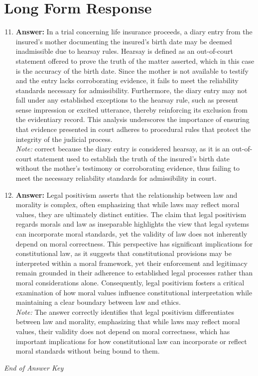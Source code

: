 \documentclass[12pt]{article}
\begin{document}
\section*{Long Form Response}
\begin{enumerate}[label=\arabic*.]
\setcounter{enumi}{10}
\item \textbf{Answer:} In a trial concerning life insurance proceeds, a diary entry from the insured's mother documenting the insured's birth date may be deemed inadmissible due to hearsay rules. Hearsay is defined as an out-of-court statement offered to prove the truth of the matter asserted, which in this case is the accuracy of the birth date. Since the mother is not available to testify and the entry lacks corroborating evidence, it fails to meet the reliability standards necessary for admissibility. Furthermore, the diary entry may not fall under any established exceptions to the hearsay rule, such as present sense impression or excited utterance, thereby reinforcing its exclusion from the evidentiary record. This analysis underscores the importance of ensuring that evidence presented in court adheres to procedural rules that protect the integrity of the judicial process.
\\ \textit{Note:} correct because the diary entry is considered hearsay, as it is an out-of-court statement used to establish the truth of the insured's birth date without the mother's testimony or corroborating evidence, thus failing to meet the necessary reliability standards for admissibility in court.
\item \textbf{Answer:} Legal positivism asserts that the relationship between law and morality is complex, often emphasizing that while laws may reflect moral values, they are ultimately distinct entities. The claim that legal positivism regards morals and law as inseparable highlights the view that legal systems can incorporate moral standards, yet the validity of law does not inherently depend on moral correctness. This perspective has significant implications for constitutional law, as it suggests that constitutional provisions may be interpreted within a moral framework, yet their enforcement and legitimacy remain grounded in their adherence to established legal processes rather than moral considerations alone. Consequently, legal positivism fosters a critical examination of how moral values influence constitutional interpretation while maintaining a clear boundary between law and ethics.
\\ \textit{Note:} The answer correctly identifies that legal positivism differentiates between law and morality, emphasizing that while laws may reflect moral values, their validity does not depend on moral correctness, which has important implications for how constitutional law can incorporate or reflect moral standards without being bound to them.
\end{enumerate}

\vfill
\noindent\textit{End of Answer Key}
\end{document}
